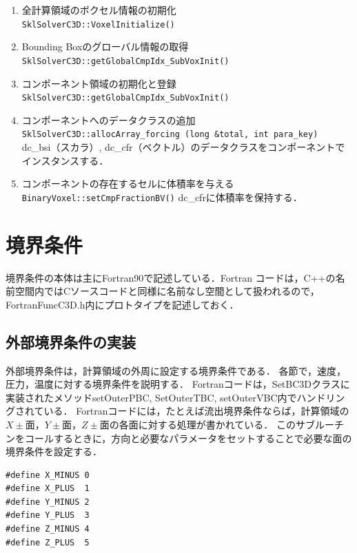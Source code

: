 \begin{enumerate}
\item 全計算領域のボクセル情報の初期化\\ 
\verb|SklSolverC3D::VoxelInitialize()|
\item Bounding Boxのグローバル情報の取得\\ 
\verb|SklSolverC3D::getGlobalCmpIdx_SubVoxInit()|
\item コンポーネント領域の初期化と登録\\ 
\verb|SklSolverC3D::getGlobalCmpIdx_SubVoxInit()|
\item コンポーネントへのデータクラスの追加\\ 
\verb|SklSolverC3D::allocArray_forcing (long &total, int para_key)|\\
dc\_bsi（スカラ）, dc\_cfr（ベクトル）のデータクラスをコンポーネントでインスタンスする．
\item コンポーネントの存在するセルに体積率を与える\\
\verb|BinaryVoxel::setCmpFractionBV()|
dc\_cfrに体積率を保持する．
\end{enumerate}



%
\section{境界条件}
境界条件の本体は主にFortran90で記述している．Fortran コードは，C++の名前空間内ではCソースコードと同様に名前なし空間として扱われるので，FortranFuncC3D.h内にプロトタイプを記述しておく．

\subsection{外部境界条件の実装}
外部境界条件は，計算領域の外周に設定する境界条件である．
各節で，速度，圧力，温度に対する境界条件を説明する．
Fortranコードは，SetBC3Dクラスに実装されたメソッドsetOuterPBC, SetOuterTBC, setOuterVBC内でハンドリングされている．
Fortranコードには，たとえば流出境界条件ならば，計算領域の$X\pm$面，$Y\pm$面，$Z\pm$面の各面に対する処理が書かれている．
このサブルーチンをコールするときに，方向と必要なパラメータをセットすることで必要な面の境界条件を設定する．

\begin{verbatim}
#define X_MINUS 0
#define X_PLUS  1
#define Y_MINUS 2
#define Y_PLUS  3
#define Z_MINUS 4
#define Z_PLUS  5
\end{verbatim}



